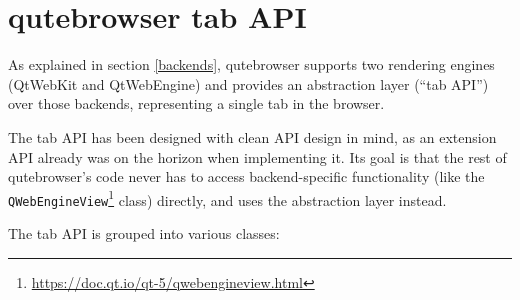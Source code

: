 \documentclass[a4paper,parskip=full,DIV=14,BCOR=15mm]{scrreprt}
\begin{document}
\section{qutebrowser tab API}
\label{tabapi}

As explained in section \ref{backends}, qutebrowser supports two rendering
engines (QtWebKit and QtWebEngine) and provides an abstraction layer (``tab
API'') over those backends, representing a single tab in the browser.

The tab API has been designed with clean API design in mind, as an extension API
already was on the horizon when implementing it. Its goal is that the rest of
qutebrowser's code never has to access backend-specific functionality (like the
\verb|QWebEngineView|\footnote{\url{https://doc.qt.io/qt-5/qwebengineview.html}}
class) directly, and uses the abstraction layer instead.

The tab API is grouped into various classes:
\end{document}
